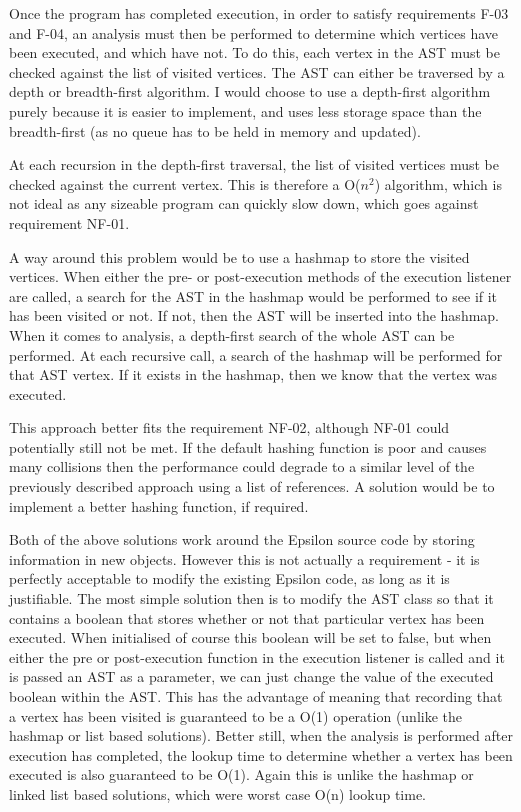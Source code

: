 Once the program has completed execution, in order to satisfy requirements F-03 and F-04, an analysis must then be performed to determine which vertices have been executed, and which have not. To do this, each vertex in the AST must be checked against the list of visited vertices. The AST can either be traversed by a depth or breadth-first algorithm. I would choose to use a depth-first algorithm purely because it is easier to implement, and uses less storage space than the breadth-first (as no queue has to be held in memory and updated).

At each recursion in the depth-first traversal, the list of visited vertices must be checked against the current vertex. This is therefore a O($n^2$) algorithm, which is not ideal as any sizeable program can quickly slow down, which goes against requirement NF-01. 

A way around this problem would be to use a hashmap to store the visited vertices. When either the pre- or post-execution methods of the execution listener are called, a search for the AST in the hashmap would be performed to see if it has been visited or not. If not, then the AST will be inserted into the hashmap. When it comes to analysis, a depth-first search of the whole AST can be performed. At each recursive call, a search of the hashmap will be performed for that AST vertex. If it exists in the hashmap, then we know that the vertex was executed.

This approach better fits the requirement NF-02, although NF-01 could potentially still not be met. If the default hashing function is poor and causes many collisions then the performance could degrade to a similar level of the previously described approach using a list of references. A solution would be to implement a better hashing function, if required.	

Both of the above solutions work around the Epsilon source code by storing information in new objects. However this is not actually a requirement - it is perfectly acceptable to modify the existing Epsilon code, as long as it is justifiable. The most simple solution then is to modify the AST class so that it contains a boolean that stores whether or not that particular vertex has been executed. When initialised of course this boolean will be set to false, but when either the pre or post-execution function in the execution listener is called and it is passed an AST as a parameter, we can just change the value of the executed boolean within the AST. This has the advantage of meaning that recording that a vertex has been visited is guaranteed to be a O(1) operation (unlike the hashmap or list based solutions). Better still, when the analysis is performed after execution has completed, the lookup time to determine whether a vertex has been executed is also guaranteed to be O(1). Again this is unlike the hashmap or linked list based solutions, which were worst case O(n) lookup time.

